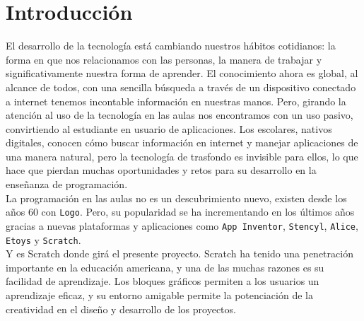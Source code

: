 \documentclass[a4paper, 12pt]{book}
\begin{document}
\tableofcontents
\cleardoublepage
\listoffigures %



\cleardoublepage
\chapter{Introducción}
\label{sec:intro} %

El desarrollo de la tecnología está cambiando nuestros hábitos cotidianos: la forma
en que nos relacionamos con las personas, la manera de trabajar y significativamente
nuestra forma de aprender. El conocimiento ahora es global, al alcance de todos, con
una sencilla búsqueda a través de un dispositivo conectado a internet tenemos incontable
información en nuestras manos. Pero, girando la atención al uso de la tecnología en las 
aulas nos encontramos con un uso pasivo, convirtiendo al estudiante en usuario de 
aplicaciones. Los escolares, nativos digitales, conocen cómo buscar información en internet 
y manejar aplicaciones de una manera natural, pero la tecnología de trasfondo es invisible 
para ellos, lo que hace que pierdan muchas oportunidades y retos para su desarrollo en la
enseñanza de programación. \\

La programación en las aulas no es un descubrimiento nuevo, existen desde los años 60  con 
\texttt{Logo}. Pero, su popularidad se ha incrementando en los últimos años gracias a nuevas 
plataformas y aplicaciones como \texttt{App Inventor}, \texttt{Stencyl}, \texttt{Alice}, 
\texttt{Etoys} y \texttt{Scratch}. \\

Y es Scratch donde girá el presente proyecto. Scratch ha tenido una penetración importante 
en la educación americana, y una de las muchas razones es su facilidad de aprendizaje. Los
bloques gráficos permiten a los usuarios un aprendizaje eficaz, y su entorno amigable permite 
la potenciación de la creatividad en el diseño y desarrollo de los proyectos. \\
\end{document}
